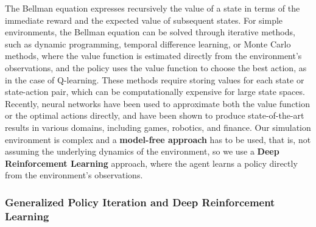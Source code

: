 The Bellman equation expresses recursively the value of a state in terms of the immediate reward and the expected value of subsequent states.
For simple environments, the Bellman equation can be solved through iterative methods, such as dynamic programming,
temporal difference learning, or Monte Carlo methods, where the value function is estimated directly from the environment's observations,
and the policy uses the value function to choose the best action, as in the case of Q-learning.
These methods require storing values for each state or state-action pair, which can be computationally expensive for large state spaces.
Recently, neural networks have been used to approximate both the value function or the optimal actions directly,
and have been shown to produce state-of-the-art results in various domains, including games, robotics, and finance.
Our simulation environment is complex and a \textbf{model-free approach} has to be used, that is, not assuming the underlying dynamics of the environment,
so we use a \textbf{Deep Reinforcement Learning} approach, where the agent learns a policy directly from the environment's observations.

\subsubsection{Generalized Policy Iteration and Deep Reinforcement Learning}

